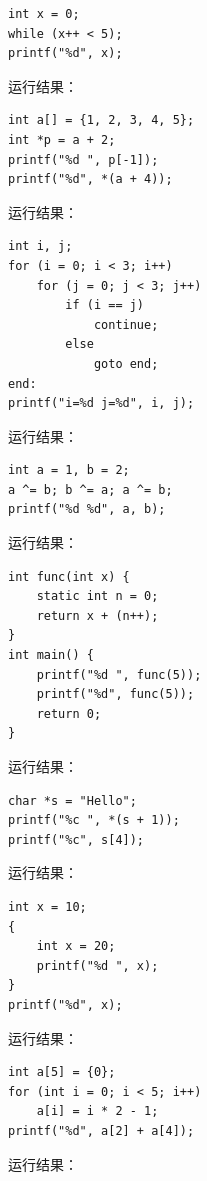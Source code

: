 \documentclass[a4paper,11pt]{article}
\begin{document}
\q
\begin{lstlisting}[language={[custom]C}]
int x = 0;
while (x++ < 5);
printf("%d", x);
\end{lstlisting}
运行结果：\underline{\hspace{3cm}}


\q
\begin{lstlisting}[language={[custom]C}]
int a[] = {1, 2, 3, 4, 5};
int *p = a + 2;
printf("%d ", p[-1]);
printf("%d", *(a + 4));
\end{lstlisting}
运行结果：\underline{\hspace{3cm}}


\q
\begin{lstlisting}[language={[custom]C}]
int i, j;
for (i = 0; i < 3; i++)
    for (j = 0; j < 3; j++)
        if (i == j)
            continue;
        else
            goto end;
end:
printf("i=%d j=%d", i, j);
\end{lstlisting}
运行结果：\underline{\hspace{3cm}}


\q
\begin{lstlisting}[language={[custom]C}]
int a = 1, b = 2;
a ^= b; b ^= a; a ^= b;
printf("%d %d", a, b);
\end{lstlisting}
运行结果：\underline{\hspace{3cm}}


\q
\begin{lstlisting}[language={[custom]C}]
int func(int x) {
    static int n = 0;
    return x + (n++);
}
int main() {
    printf("%d ", func(5));
    printf("%d", func(5));
    return 0;
}
\end{lstlisting}
运行结果：\underline{\hspace{3cm}}


\q
\begin{lstlisting}[language={[custom]C}]
char *s = "Hello";
printf("%c ", *(s + 1));
printf("%c", s[4]);
\end{lstlisting}
运行结果：\underline{\hspace{3cm}}


\q
\begin{lstlisting}[language={[custom]C}]
int x = 10;
{
    int x = 20;
    printf("%d ", x);
}
printf("%d", x);
\end{lstlisting}
运行结果：\underline{\hspace{3cm}}


\q
\begin{lstlisting}[language={[custom]C}]
int a[5] = {0};
for (int i = 0; i < 5; i++)
    a[i] = i * 2 - 1;
printf("%d", a[2] + a[4]);
\end{lstlisting}
运行结果：\underline{\hspace{3cm}}
\end{document}
